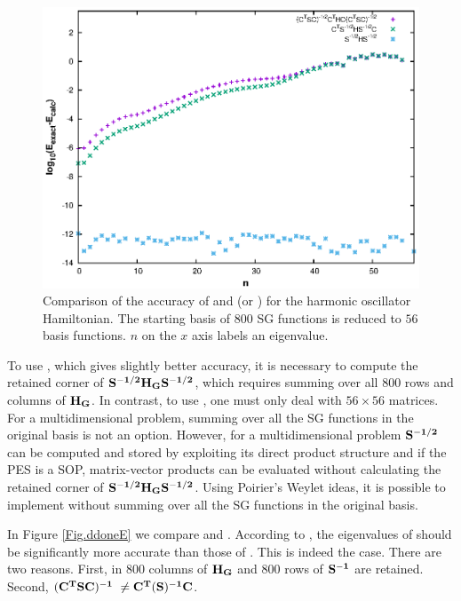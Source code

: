 %
%
\begin{figure}[t]
\includegraphics[width=6.5in]{./JCP2/fig1.eps}
\caption[Comparison of different symmetric chopping schemes for the harmonic oscillator]{Comparison of the accuracy of  and  (or ) for 
the harmonic oscillator Hamiltonian.  The starting basis of $800$ SG functions  is reduced to 
$56$ basis functions.  $n$ on the $x$ axis labels an  eigenvalue.  \label{Fig.ddhalfE}}
\end{figure}





 To use , which gives slightly better accuracy,   it is necessary to compute the retained corner of $ {\bf{    S^{-1/2}   H_G   S^{-1/2} }} $,
which  requires  summing over all 800 rows and  columns of    $ {\bf{  H_G   }} $.
In contrast,  to use  , one must only deal with $56 \times 56$ matrices.   For a multidimensional problem,  summing over all the SG functions in the 
original basis is not an option. However, for a multidimensional problem  $ {\bf{    S^{-1/2} }} $ can be computed and stored by exploiting its direct product
structure and if the PES is a SOP,  matrix-vector products can be evaluated without calculating the retained corner of $ {\bf{     S^{-1/2}   H_G   S^{-1/2}         }} $.   
%
Using Poirier's Weylet ideas,  it is possible to implement      without     summing over all the SG functions in the 
original basis. 





%
  In Figure \ref{Fig.ddoneE}   we compare   and .  
  According to   , the eigenvalues of  should be significantly more 
  accurate than those of . 
  This is indeed the case.  
%
There are two reasons.   
First, in    800 columns of    ${\bf{     H_G     }} $ and 800 rows of  ${\bf{   S^{-1}          }} $  are retained.   
Second,   ${\bf{   (C^T S C)^{-1}          }} $ $ \ne {\bf{  C^T  ( S )^{-1}       C   }} $.
%
%




